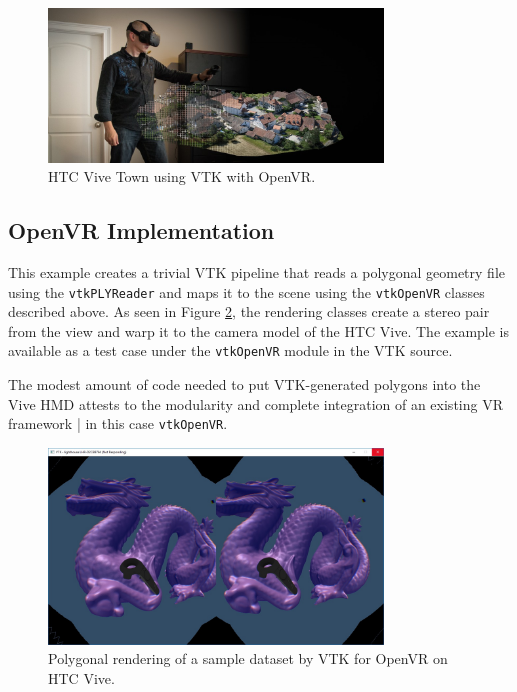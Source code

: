 \begin{figure}[h!]
  \centering
  \includegraphics[width=3.5in]{images/ViveTownData.png}
  \caption{HTC Vive Town using VTK with OpenVR.}
  \label{fig:ViveTown}
\end{figure}

\subsection{OpenVR Implementation}

This example creates a trivial VTK pipeline that reads a polygonal geometry file
using the \texttt{vtkPLYReader} and maps it to the scene using the \texttt{vtkOpenVR}
classes described above. As seen in Figure \ref{fig:openvrdragon}, the rendering
classes create a stereo pair from the view and warp it to the camera model of
the HTC Vive. 
The example is available as a test case under the
\texttt{vtkOpenVR} module in the VTK source.

The modest amount of code needed to put VTK-generated polygons into the
Vive HMD attests to the modularity and complete integration of an
existing VR framework | in this case \texttt{vtkOpenVR}.

\begin{figure}[h!]
  \centering
  \includegraphics[width=3.5in]{images/Dragon.jpg}
  \caption{Polygonal rendering of a sample dataset by VTK for OpenVR on HTC Vive.}
  \label{fig:openvrdragon}
\end{figure}